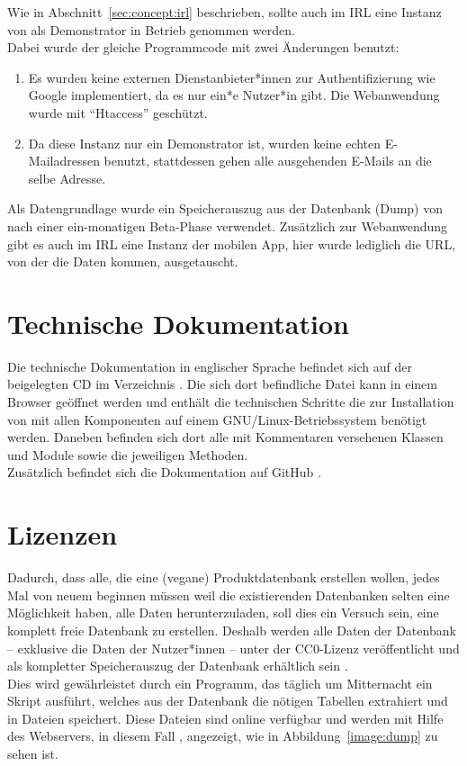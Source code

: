 Wie in Abschnitt~\ref{sec:concept:irl} beschrieben, sollte auch im \ac{IRL}
eine Instanz von \name als Demonstrator in Betrieb genommen werden.\\
Dabei wurde der gleiche Programmcode mit zwei Änderungen benutzt:

\begin{enumerate}
  \item Es wurden keine externen Dienstanbieter*innen zur Authentifizierung wie 
Google 
implementiert, da es nur
    ein*e Nutzer*in gibt. Die Webanwendung wurde mit
    "`Htaccess"' geschützt.
  \item Da diese Instanz nur ein Demonstrator ist, wurden keine
    echten E-Mailadressen benutzt, stattdessen gehen alle
    ausgehenden E-Mails an die selbe Adresse.
\end{enumerate}

Als Datengrundlage wurde ein Speicherauszug aus der Datenbank (Dump) von 
\name nach einer ein-monatigen Beta-Phase
verwendet.
Zusätzlich zur Webanwendung gibt es auch im \ac{IRL} eine Instanz der
mobilen App, hier wurde lediglich die \ac{URL}, von der die Daten
kommen, ausgetauscht.

\section{Technische Dokumentation}
\label{sec:implementation:docu}

Die technische Dokumentation in englischer Sprache befindet sich auf der beigelegten CD im
Verzeichnis . Die sich dort befindliche
Datei  kann in einem Browser geöffnet werden
und enthält die technischen Schritte die zur Installation von \name
mit allen Komponenten auf einem GNU/Linux-Betriebssystem benötigt
werden. Daneben befinden sich dort alle mit Kommentaren versehenen Klassen und
Module sowie die jeweiligen Methoden.\\
Zusätzlich befindet sich die Dokumentation auf GitHub
.

\section{Lizenzen}
\label{sec:licenses}
\label{sec:implementation:licenses}
Dadurch, dass alle, die eine (vegane) Produktdatenbank erstellen
wollen, jedes Mal von neuem beginnen müssen weil die existierenden
Datenbanken selten eine Möglichkeit haben, alle Daten herunterzuladen,
soll dies ein Versuch sein, eine komplett freie Datenbank zu erstellen.
Deshalb werden alle Daten der Datenbank -- exklusive die Daten der
Nutzer*innen -- unter der CC0-Lizenz veröffentlicht 
und als kompletter Speicherauszug der Datenbank erhältlich sein
.\\
Dies wird gewährleistet durch ein Programm, das
täglich um Mitternacht ein Skript ausführt, welches aus der Datenbank die
nötigen Tabellen extrahiert und in Dateien speichert.
Diese Dateien sind online verfügbar und werden mit Hilfe des
Webservers, in diesem Fall , angezeigt, wie in
Abbildung~\ref{image:dump} zu sehen ist.

